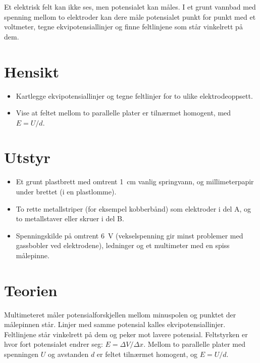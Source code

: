 \documentclass[11pt]{article}
\begin{document}

Et elektrisk felt kan ikke ses, men potensialet kan måles. I et grunt vannbad med spenning mellom to elektroder kan dere måle potensialet punkt for punkt med et voltmeter, tegne ekvipotensiallinjer og finne feltlinjene som står vinkelrett på dem.

\section*{Hensikt}

\begin{itemize}
\item Kartlegge ekvipotensiallinjer og tegne feltlinjer for to ulike elektrodeoppsett.
\item Vise at feltet mellom to parallelle plater er tilnærmet homogent, med $E = U/d$.
\end{itemize}

\section*{Utstyr}

\begin{itemize}
\item Et grunt plastbrett med omtrent 1~cm vanlig springvann, og millimeterpapir under brettet (i en plastlomme).
\item To rette metallstriper (for eksempel kobberbånd) som elektroder i del A, og to metallstaver eller skruer i del B.
\item Spenningskilde på omtrent 6~V (vekselspenning gir minst problemer med gassbobler ved elektrodene), ledninger og et multimeter med en spiss målepinne.
\end{itemize}

\section*{Teorien}

Multimeteret måler potensialforskjellen mellom minuspolen og punktet der målepinnen står. Linjer med samme potensial kalles ekvipotensiallinjer. Feltlinjene står vinkelrett på dem og peker mot lavere potensial. Feltstyrken er hvor fort potensialet endrer seg: $E = ΔV/Δx$. Mellom to parallelle plater med spenningen $U$ og avstanden $d$ er feltet tilnærmet homogent, og $E = U/d$.
\end{document}
